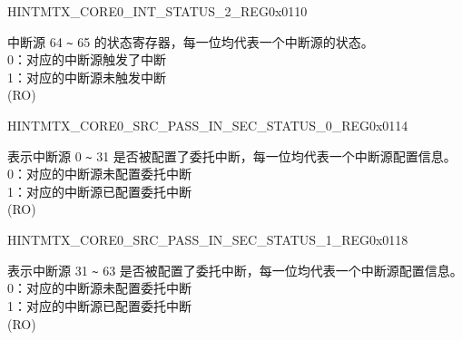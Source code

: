 \begin{register}{H}{INTMTX\_CORE0\_INT\_STATUS\_2\_REG}{0x0110}\label{regdesc:INTMTXCORE0INTSTATUS2REG}
%
\regnewline%
\begin{regdesc}\begin{reglist}
\label{fielddesc:INTMTXCORE0INTSTATUS2}\item [INTMTX\_CORE0\_INT\_STATUS\_2] 中断源 64 \verb+~+ 65 的状态寄存器，每一位均代表一个中断源的状态。\\
0：对应的中断源触发了中断\\
1：对应的中断源未触发中断\\ (RO)
\end{reglist}\end{regdesc}
\end{register}


\begin{register}{H}{INTMTX\_CORE0\_SRC\_PASS\_IN\_SEC\_STATUS\_0\_REG}{0x0114}\label{regdesc:INTMTXCORE0SRCPASSINSECSTATUS0REG}
%
\regnewline%
\begin{regdesc}\begin{reglist}
\label{fielddesc:INTMTXCORE0INTSRCPASSINSECSTATUS0}\item [INTMTX\_CORE0\_INT\_SRC\_PASS\_IN\_SEC\_STATUS\_0] 表示中断源 0 \verb+~+ 31 是否被配置了委托中断，每一位均代表一个中断源配置信息。\\

0：对应的中断源未配置委托中断\\
1：对应的中断源已配置委托中断\\ (RO)
\end{reglist}\end{regdesc}
\end{register}


\begin{register}{H}{INTMTX\_CORE0\_SRC\_PASS\_IN\_SEC\_STATUS\_1\_REG}{0x0118}\label{regdesc:INTMTXCORE0SRCPASSINSECSTATUS1REG}
%
\regnewline%
\begin{regdesc}\begin{reglist}
\label{fielddesc:INTMTXCORE0INTSRCPASSINSECSTATUS1}\item [INTMTX\_CORE0\_INT\_SRC\_PASS\_IN\_SEC\_STATUS\_1] 表示中断源 31 \verb+~+ 63 是否被配置了委托中断，每一位均代表一个中断源配置信息。\\

0：对应的中断源未配置委托中断\\
1：对应的中断源已配置委托中断\\ (RO)
\end{reglist}\end{regdesc}
\end{register}



